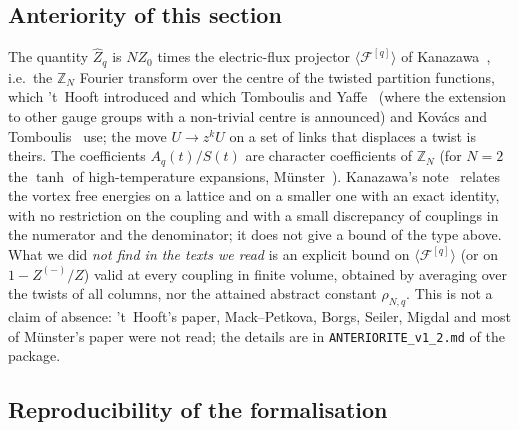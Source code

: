 \documentclass[11pt,a4paper]{article}
\theoremstyle{plain}
\theoremstyle{definition}
\theoremstyle{remark}
\numberwithin{equation}{section}
\begin{document}
\subsection{Anteriority of this section}\label{sec:zn-ant}
The quantity $\hat Z_q$ is $NZ_0$ times the electric-flux projector $\langle\mathcal F^{[q]}\rangle$ of Kanazawa~\cite{Kan}, i.e.\ the $\mathbb Z_N$ Fourier transform over the centre of the twisted partition functions, which 't~Hooft introduced and which Tomboulis and Yaffe~\cite[p.~317, App.~I.C, p.~333]{TY85} (where the extension to other gauge groups with a non-trivial centre is announced) and Kov\'acs and Tomboulis~\cite{KT02} use; the move $U\to z^kU$ on a set of links that displaces a twist is theirs. The coefficients $A_q(t)/S(t)$ are character coefficients of $\mathbb Z_N$ (for $N=2$ the $\tanh$ of high-temperature expansions, Münster~\cite{Mun81}). Kanazawa's note~\cite{Kan09} relates the vortex free energies on a lattice and on a smaller one with an exact identity, with no restriction on the coupling and with a small discrepancy of couplings in the numerator and the denominator; it does not give a bound of the type above. What we did \emph{not find in the texts we read} is an explicit bound on $\langle\mathcal F^{[q]}\rangle$ (or on $1-Z^{(-)}/Z$) valid at every coupling in finite volume, obtained by averaging over the twists of all columns, nor the attained abstract constant $\rho_{N,q}$. This is not a claim of absence: 't~Hooft's paper, Mack--Petkova, Borgs, Seiler, Migdal and most of Münster's paper were not read; the details are in \texttt{ANTERIORITE\_v1\_2.md} of the package.

\subsection{Reproducibility of the formalisation}\label{sec:zn-repro}
\end{document}
